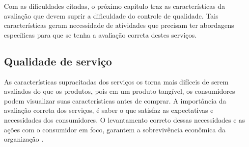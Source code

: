 Com as dificuldades citadas, o próximo capítulo traz as características da avaliação que devem suprir a dificuldade do controle de qualidade. Tais características geram necessidade de atividades que precisam ter abordagens específicas para que se tenha a avaliação correta destes serviços. 

\subsection{Qualidade de serviço}

As características supracitadas dos serviços os torna mais difíceis de serem avaliados do que os produtos, pois em um produto tangível, os consumidores podem visualizar suas características antes de comprar. A importância da avaliação correta dos serviços, é saber o que satisfaz as expectativas e necessidades dos consumidores. O levantamento correto dessas necessidades e as ações com o consumidor em foco, garantem a sobrevivência econômica da organização \cite{zeithaml1981}. 

